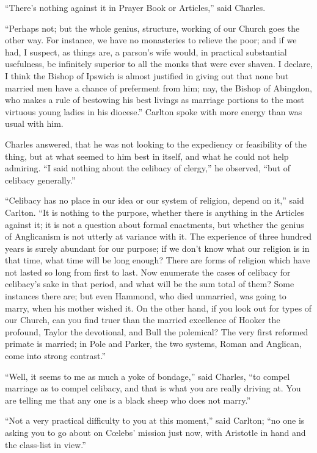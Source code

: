 ``There's nothing against it in Prayer Book or Articles,''
said Charles.

``Perhaps not; but the whole genius, structure, working of our
Church goes the other way. For instance, we have no monasteries to
relieve the poor; and if we had, I suspect, as things are, a parson's
wife would, in practical substantial usefulness, be infinitely
superior to all the monks that were ever shaven. I declare, I think
the Bishop of Ipswich is almost justified in giving out that none but
married men have a chance of preferment from him; nay, the Bishop of
Abingdon, who makes a rule of bestowing his best livings as marriage
portions to the most virtuous young ladies in his diocese.''
Carlton spoke with more energy than was usual with him.

Charles answered, that he was not looking to the expediency or feasibility of the thing, but at what seemed to him best in itself,
and what he could not help admiring. ``I said nothing about the
celibacy of clergy,'' he observed, ``but of celibacy
generally.''

``Celibacy has no place in our idea or our system of religion,
depend on it,'' said Carlton. ``It is nothing to the purpose,
whether there is anything in the Articles against it; it is not a
question about formal enactments, but whether the genius of
Anglicanism is not utterly at variance with it. The experience of
three hundred years is surely abundant for our purpose; if we don't
know what our religion is in that time, what time will be long enough?
There are forms of religion which have not lasted so long from first
to last. Now enumerate the cases of celibacy for celibacy's sake in
that period, and what will be the sum total of them? Some instances
there are; but even Hammond, who died unmarried, was going to marry,
when his mother wished it. On the other hand, if you look out for
types of our Church, can you find truer than the married excellence of
Hooker the profound, Taylor the devotional, and Bull the polemical?
The very first reformed primate is married; in Pole and Parker, the
two systems, Roman and Anglican, come into strong contrast.''

``Well, it seems to me as much a yoke of bondage,'' said
Charles, ``to compel marriage as to compel celibacy, and that is
what you are really driving at. You are telling me that any one is a
black sheep who does not marry.''

``Not a very practical difficulty to you at this moment,''
said Carlton; ``no one is asking you to go about on Cœlebs'
mission just now, with Aristotle in hand and the class-list in
view.''

